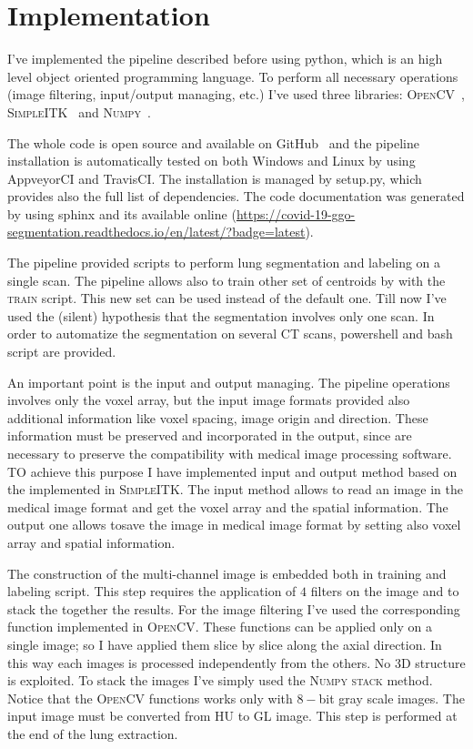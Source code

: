
	
	\section{Implementation}
	
	
	I've implemented the pipeline described before using python, which is an high level object oriented programming language. To perform all necessary operations (image filtering, input/output managing, etc.) I've used three libraries: \textsc{OpenCV}~\cite{OpenCV}, \textsc{SimpleITK}~\cite{SimpleITK} and \textsc{Numpy}~\cite{Numpy}.
	
	The whole code is open source and available on GitHub~\cite{REP:CTLungSeg} and the pipeline installation is automatically tested on both Windows and Linux by using AppveyorCI and TravisCI.  The installation is managed by setup.py, which provides also the full list of dependencies. The code documentation was generated by using sphinx and its available online (\url{https://covid-19-ggo-segmentation.readthedocs.io/en/latest/?badge=latest}). 
	

	The pipeline provided scripts to perform lung segmentation and labeling on a single scan. The pipeline allows also to train other set of centroids by with the \textsc{train} script. This new set can be used instead of the default one. 
	Till now I've used the (silent) hypothesis that the segmentation involves only one scan. In order to automatize the segmentation on several CT scans, powershell and bash script are provided.
	
	An important point is the input and output managing. The pipeline operations involves only the voxel array, but the input image formats provided also additional information like voxel spacing, image origin and direction. These information must be preserved and incorporated in the output, since are necessary to preserve the compatibility with medical image processing software. 
	TO achieve this purpose I have implemented input and output method based on the implemented in \textsc{SimpleITK}. The input method allows to read an image in the medical image format and get the voxel array and the spatial information. The output one allows tosave the image in medical image format by setting also voxel array and spatial information.

	
	The construction of the multi-channel image is embedded both in training and labeling script. This step requires the application of $4$ filters on the image and to stack the together the results. For the image filtering I've used the corresponding function implemented in \textsc{OpenCV}. These functions can be applied only on a single image; so I have applied them slice by slice along the axial direction. In this way each images is processed independently from the others. No 3D structure is exploited. To stack the images I've simply used the \textsc{Numpy} \textsc{stack} method.
	Notice that the \textsc{OpenCV} functions works only with $8-$bit gray scale images. The input image must be converted from HU to GL image. This step is performed at the end of the lung extraction.
	



	
	

 
